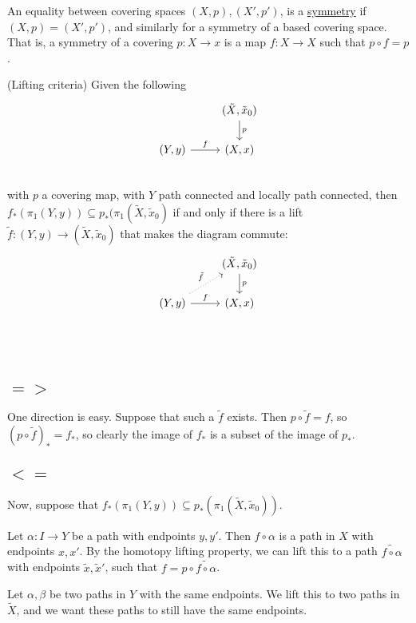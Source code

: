 \documentclass[x11names,reqno,14pt]{extarticle}
\begin{document}

An equality between covering spaces $(X, p), (X', p')$, is a \underline{symmetry} if $(X, p) = (X', p')$, and similarly for a symmetry of a based covering space. That is, a symmetry of a covering $p:X\to x$ is a map $f:X\to X$ such that $p \circ f = p$. 

\prop (Lifting criteria)
Given the following
\[
\begin{tikzcd}
& (\tilde{X}, \tilde{x}_0) \ar[d, "p"] \\
(Y, y) \ar[r, "f"] & (X, x) \\
\end{tikzcd}
\]
with $p$ a covering map, with $Y$ path connected and locally path connected, then $f_*(\pi_1(Y, y)) \subseteq p_*(\pi_1(\tilde{X}, \tilde{x}_0)$ if and only if there is a lift $\tilde{f}:(Y, y) \to (\tilde{X},\tilde{x}_0)$ that makes the diagram commute:
\[
\begin{tikzcd}
& (\tilde{X}, \tilde{x}_0) \ar[d, "p"] \\
(Y, y) \ar[r, "f"]\ar[ur, dotted, "\tilde{f}"] & (X, x) \\
\end{tikzcd}
\]

\proof\,

\subsection*{$=>$}

One direction is easy. Suppose that such a $\tilde{f}$ exists. Then $p\circ\tilde{f} = f$, so $(p\circ\tilde{f})_* = f_*$, so clearly the image of $f_*$ is a subset of the image of $p_*$.

\subsection*{$<=$} 

Now, suppose that $f_*(\pi_1(Y, y)) \subseteq p_*(\pi_1(\tilde{X},\tilde{x}_0))$. 

Let $\alpha:I\to Y$ be a path with endpoints $y, y'$. Then $f\circ\alpha$ is a path in $X$ with endpoints $x, x'$. By the homotopy lifting property, we can lift this to a path $\tilde{f\circ\alpha}$ with endpoints $\tilde{x},\tilde{x}'$, such that $f = p\circ\tilde{f\circ\alpha}$. 

Let $\alpha,\beta$ be two paths in $Y$ with the same endpoints. We lift this to two paths in $\tilde{X}$, and we want these paths to still have the same endpoints.
\end{document}
